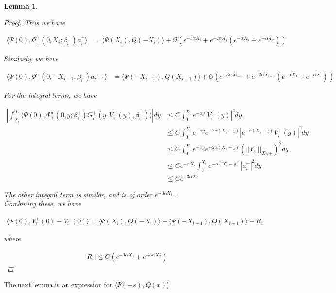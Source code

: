 \documentclass[12pt]{article}
\newtheorem{lemma}{Lemma}
\begin{document}
\begin{lemma}
\begin{proof}
Thus we have

\begin{align*}
\langle \Psi(0), \Phi^u_+(0, X_i; \beta_i^+) a_i^+ \rangle
&= \langle \Psi(X_i), Q(-X_i) \rangle + \mathcal{O}(e^{-3 \alpha X_i} + e^{-2 \alpha X_i} (e^{-\alpha X_1} + e^{-\alpha X_2})) 
\end{align*}

Similarly, we have

\begin{align*}
 \langle \Psi(0), \Phi^s_-(0, -X_{i-1}, \beta_i^-) a_{i-1}^- \rangle 
&= \langle \Psi(-X_{i-1}), Q(X_{i-1}) \rangle + \mathcal{O}(e^{-3 \alpha X_{i-1}} + e^{-2 \alpha X_{i-1}} (e^{-\alpha X_1} + e^{-\alpha X_2})) 
\end{align*}

For the integral terms, we have

\begin{align*}
\left| \int_{X_i}^0 \langle \Psi(0), \Phi_+^u(0, y; \beta_i^+) G_i^+(y, V_i^+(y),\beta_i^+) \rangle \right| dy &\leq C \int_0^{X_i} e^{-\alpha y} |V_i^+(y)|^2 dy \\
&\leq C \int_0^{X_i} e^{-\alpha y} e^{-2 \alpha(X_i - y)}|e^{-\alpha (X_i - y)} V_i^+(y)|^2 dy \\
&\leq C \int_0^{X_i} e^{-\alpha y} e^{-2 \alpha(X_i - y)}(||V_i^+||_{X_i, +})^2 dy \\
&\leq C e^{-\alpha X_i} \int_0^{X_i} e^{-\alpha (X_i - y)} |a_i^+|^2 dy \\
&\leq C e^{-3 \alpha X_i}
\end{align*}

The other integral term is similar, and is of order $e^{-3 \alpha X_{i-1}}$\\

Combining these, we have

\begin{align*}
\langle \Psi(0), V_i^+(0) - V_i^-(0) \rangle = 
\langle \Psi(X_i), Q(-X_i) \rangle - \langle \Psi(-X_{i-1}), Q(X_{i-1}) \rangle + R_i
\end{align*}

where 

\begin{align*}
|R_i| \leq C ( e^{-3 \alpha X_1} +  e^{-3 \alpha X_2} )
\end{align*}

\end{proof}
\end{lemma}

The next lemma is an expression for $\langle \Psi(-x), Q(x) \rangle$
\end{document}
